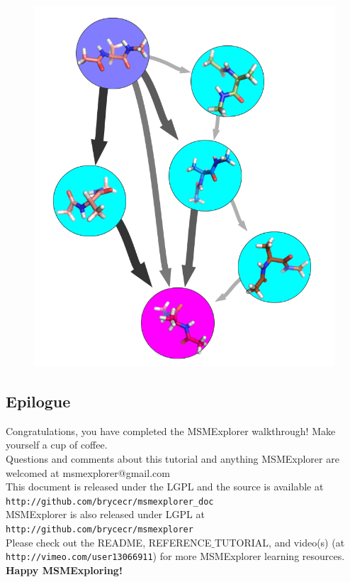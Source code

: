 \documentclass[10pt,a4paper]{report}
\begin{document}
\begin{figure}[h]
\includegraphics[scale=.3]{TPTdemo.png}
\end{figure}

\subsection*{Epilogue}

Congratulations, you have completed the MSMExplorer walkthrough! Make yourself a cup of coffee. 
\\

Questions and comments about this tutorial and anything MSMExplorer are welcomed at msmexplorer@gmail.com
\\

This document is released under the LGPL and the source is available at \texttt{http://github.com/brycecr/msmexplorer\_doc}
\\

MSMExplorer is also released under LGPL at 
\texttt{http://github.com/brycecr/msmexplorer}
\\

Please check out the README, REFERENCE$\_$TUTORIAL, and video(s) (at \texttt{http://vimeo.com/user13066911}) for more MSMExplorer learning resources. 
\\

\textbf{Happy MSMExploring!}
\end{document}
